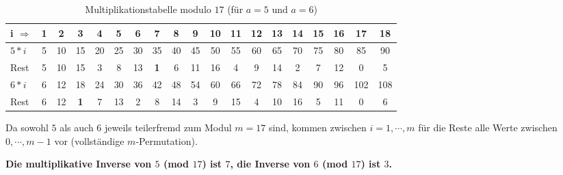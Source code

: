 \begin{refsegment}
\begin{table}[ht]
\begin{center}
\begin{tabular}{|l@{\:}||c|c|c|c|c|c|c|c|c|c|c|c|c|c|c|c||c|c|}
\hline
i $\Rightarrow$     & 1  & 2  & 3  & 4  & 5  & 6  & 7  & 8  & 9 & 10 & 11 & 12 & 13 & 14 & 15 & 16  & 17 & 18\\
\hline
\hline
$5*i$               & 5 & 10 & 15 & 20 & 25 & 30 & 35 & 40 & 45 & 50 & 55 & 60 & 65 & 70 & 75 & 80  & 85 & 90\\
Rest                & 5 & 10 & 15  & 3  & 8 & 13  & \textbf{1}  & 6 & 11 & 16  & 4  & 9 & 14  & 2  & 7 & 12   & 0  & 5\\
\hline
$6*i$               & 6 & 12 & 18 & 24 & 30 & 36 & 42 & 48 & 54 & 60 & 66 & 72 & 78 & 84 & 90 & 96 & 102 & 108\\
Rest                & 6 & 12  & \textbf{1}  & 7 & 13  & 2  & 8 & 14  & 3  & 9 & 15  & 4 & 10 & 16  & 5 & 11   & 0  & 6\\
\hline
\end{tabular}
\end{center}
\caption{Multiplikationstabelle modulo $17$ (für $a=5$ und $a=6$)}
\label{SrcArith1a} \label{mulmod17}
\end{table}

Da sowohl $5$ als auch $6$ jeweils teilerfremd  zum Modul
$m=17$ sind, kommen zwischen $i=1, \cdots, m$ für die Reste alle Werte zwischen
$0, \cdots, m-1$ vor (vollständige $m$-Permutation).

\textbf{Die multiplikative Inverse von $5$ (mod $17$)
ist $7$, die Inverse von $6$ (mod $17$) ist $3$.}





\end{refsegment}
